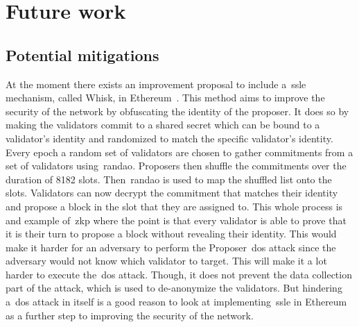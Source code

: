 

\section{Future work}\label{sec:future-works}

\subsection{Potential mitigations}\label{subsec:potential-mitigations}
At the moment there exists an improvement proposal
to include a~\gls{ssle} mechanism, called Whisk, in Ethereum~\cite{EthereumResearchSSLE2024}.
This method aims to improve the security of the network by obfuscating the identity of the proposer.
It does so by making the validators commit to a shared secret which can be bound to a validator's identity and randomized to match the specific validator's identity.
Every epoch a random set of validators are chosen to gather commitments from a set of validators using~\gls{randao}.
Proposers then shuffle the commitments over the duration of 8182 slots.
Then~\gls{randao} is used to map the shuffled list onto the slots.
Validators can now decrypt the commitment that matches their identity and propose a block in the slot that they are assigned to.
This whole process is and example of~\gls{zkp} where the point is that every validator is able to prove that it is their turn to propose a block without revealing their identity.
This would make it harder
for an adversary to perform the Proposer~\gls{dos} attack since the adversary would not know which validator to target.
This will make it a lot harder to execute the~\gls{dos} attack.
Though, it does not prevent the data collection part of the attack, which is used to de-anonymize the validators.
But hindering a~\gls{dos} attack in itself is a good reason
to look at implementing~\gls{ssle} in Ethereum as a further step to improving the security of the network.
